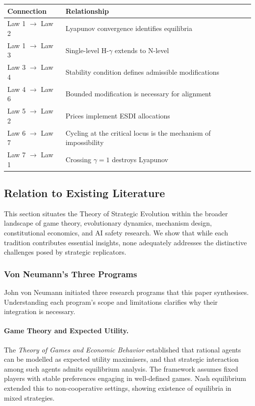 \documentclass[12pt]{article}
\begin{document}
\begin{center}
\begin{tabular}{ll}
\toprule
\textbf{Connection} & \textbf{Relationship} \\
\midrule
Law 1 $\to$ Law 2 & Lyapunov convergence identifies equilibria \\
Law 1 $\to$ Law 3 & Single-level H-$\gamma$ extends to N-level \\
Law 3 $\to$ Law 4 & Stability condition defines admissible modifications \\
Law 4 $\to$ Law 6 & Bounded modification is necessary for alignment \\
Law 5 $\to$ Law 2 & Prices implement ESDI allocations \\
Law 6 $\to$ Law 7 & Cycling at the critical locus is the mechanism of impossibility \\
Law 7 $\to$ Law 1 & Crossing $\gamma = 1$ destroys Lyapunov \\
\bottomrule
\end{tabular}
\end{center}


\subsection{Relation to Existing Literature}

This section situates the Theory of Strategic Evolution within the broader landscape of game theory, evolutionary dynamics, mechanism design, constitutional economics, and AI safety research. We show that while each tradition contributes essential insights, none adequately addresses the distinctive challenges posed by strategic replicators.

\subsubsection{Von Neumann's Three Programs}

John von Neumann initiated three research programs that this paper synthesises. Understanding each program's scope and limitations clarifies why their integration is necessary.

\paragraph{Game Theory and Expected Utility.}
The \emph{Theory of Games and Economic Behavior} \citep{vonneumann1944} established that rational agents can be modelled as expected utility maximisers, and that strategic interaction among such agents admits equilibrium analysis. The framework assumes fixed players with stable preferences engaging in well-defined games. Nash equilibrium \citep{nash1950} extended this to non-cooperative settings, showing existence of equilibria in mixed strategies.
\end{document}
